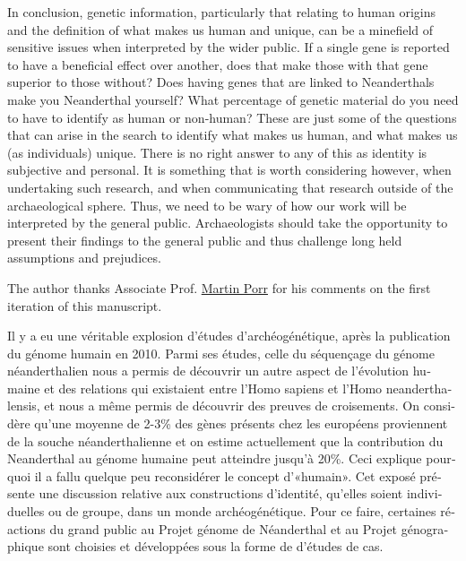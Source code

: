 
In conclusion, genetic information, particularly that relating to human origins and the definition of what makes us human and unique, can be a minefield of sensitive issues when interpreted by the wider public. If a single gene is reported to have a beneficial effect over another, does that make those with that gene superior to those without? Does having genes that are linked to Neanderthals make you Neanderthal yourself? What percentage of genetic material do you need to have to identify as human or non-human? These are just some of the questions that can arise in the search to identify what makes us human, and what makes us (as individuals) unique. There is no right answer to any of this as identity is subjective and personal. It is something that is worth considering however, when undertaking such research, and when communicating that research outside of the archaeological sphere. Thus, we need to be wary of how our work will be interpreted by the general public. Archaeologists should take the opportunity to present their findings to the general public and thus challenge long held assumptions and prejudices.

\myseparator
The author thanks Associate Prof. \href{https://uwa.academia.edu/MartinPorr}{Martin Porr} for his comments on the first iteration of this manuscript.


\begin{myabstract}
\foreignlanguage{french}{Il y a eu une véritable explosion d’études d’archéogénétique, après la publication du génome humain en 2010. Parmi ses études, celle du séquençage du génome néanderthalien nous a permis de découvrir un autre aspect de l’évolution humaine et des relations qui existaient entre l’Homo sapiens et l’Homo neanderthalensis, et nous a même permis de découvrir des preuves de croisements. On considère qu’une moyenne de 2-3\% des gènes présents chez les européens proviennent de la souche néanderthalienne et on estime actuellement que la contribution du Neanderthal au génome humaine peut atteindre jusqu’à 20\%. Ceci explique pourquoi il a fallu quelque peu reconsidérer le concept d’«humain». Cet exposé présente une discussion relative aux constructions d’identité, qu’elles soient individuelles ou de groupe, dans un monde archéogénétique. Pour ce faire, certaines réactions du grand public au Projet génome de Néanderthal et au Projet génographique sont choisies et développées sous la forme de d’études de cas.}



\end{myabstract}
\printbibliography[heading=subbibnumbered] 
	\label{Maggio:lastpage}
\closingarticle
